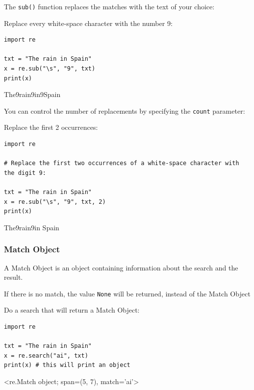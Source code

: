 \documentclass[12pt,a4paper]{article}
\newcommand{\code}[1]{%
	\colorbox{backcolour}{\lstinline{#1}}%
}
\newcommand{\lcode}[1]{%
	\lstinline{#1}%
}
\begin{document}
The \code{sub()} function replaces the matches with the text of your choice:

\begin{ebox}
Replace every white-space character with the number 9:
	\begin{lstlisting}
import re

txt = "The rain in Spain"
x = re.sub("\s", "9", txt)
print(x)
	\end{lstlisting}
\tcblower
	\begin{vercode}
The9rain9in9Spain
	\end{vercode}
\end{ebox}

You can control the number of replacements by specifying the \code{count} parameter:

\begin{ebox}
Replace the first 2 occurrences:
	\begin{lstlisting}
import re

# Replace the first two occurrences of a white-space character with the digit 9:

txt = "The rain in Spain"
x = re.sub("\s", "9", txt, 2)
print(x)
	\end{lstlisting}
\tcblower
	\begin{vercode}
The9rain9in Spain
	\end{vercode}
\end{ebox}
\subsubsection{Match Object}

A Match Object is an object containing information about the search and the result.

\begin{nbox}
If there is no match, the value \lcode{None} will be returned, instead of the
Match Object
\end{nbox}

\begin{ebox}
Do a search that will return a Match Object:
	\begin{lstlisting}
import re

txt = "The rain in Spain"
x = re.search("ai", txt)
print(x) # this will print an object
	\end{lstlisting}
\tcblower
	\begin{vercode}
<re.Match object; span=(5, 7), match='ai'>
	\end{vercode}
\end{ebox}
\end{document}
